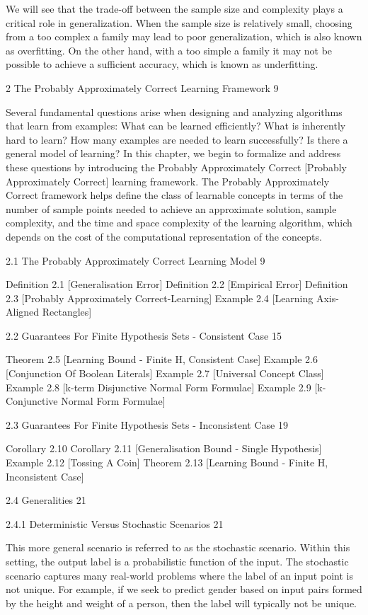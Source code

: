 We will see that the trade-off between the sample size and complexity plays a critical role in generalization. When the sample size is relatively small, choosing from a too complex a family may lead to poor generalization, which is also known as overfitting. On the other hand, with a too simple a family it may not be possible to achieve a sufficient accuracy, which is known as underfitting.

2 The Probably Approximately Correct Learning Framework 9

Several fundamental questions arise when designing and analyzing algorithms that learn from examples: What can be learned efficiently? What is inherently hard to learn? How many examples are needed to learn successfully? Is there a general model of learning? In this chapter, we begin to formalize and address these questions by introducing the Probably Approximately Correct [Probably Approximately Correct] learning framework. The Probably Approximately Correct framework helps define the class of learnable concepts in terms of the number of sample points needed to achieve an approximate solution, sample complexity, and the time and space complexity of the learning algorithm, which depends on the cost of the computational representation of the concepts.

2.1 The Probably Approximately Correct Learning Model 9

Definition 2.1 [Generalisation Error]
Definition 2.2 [Empirical Error]
Definition 2.3 [Probably Approximately Correct-Learning]
Example 2.4 [Learning Axis-Aligned Rectangles]

2.2 Guarantees For Finite Hypothesis Sets - Consistent Case 15

Theorem 2.5 [Learning Bound - Finite H, Consistent Case]
Example 2.6 [Conjunction Of Boolean Literals]
Example 2.7 [Universal Concept Class]
Example 2.8 [k-term Disjunctive Normal Form Formulae]
Example 2.9 [k-Conjunctive Normal Form Formulae]

2.3 Guarantees For Finite Hypothesis Sets - Inconsistent Case 19

Corollary 2.10
Corollary 2.11 [Generalisation Bound - Single Hypothesis]
Example 2.12 [Tossing A Coin]
Theorem 2.13 [Learning Bound - Finite H, Inconsistent Case]

2.4 Generalities 21



2.4.1 Deterministic Versus Stochastic Scenarios 21

This more general scenario is referred to as the stochastic scenario. Within this setting, the output label is a probabilistic function of the input. The stochastic scenario captures many real-world problems where the label of an input point is not unique. For example, if we seek to predict gender based on input pairs formed by the height and weight of a person, then the label will typically not be unique.

